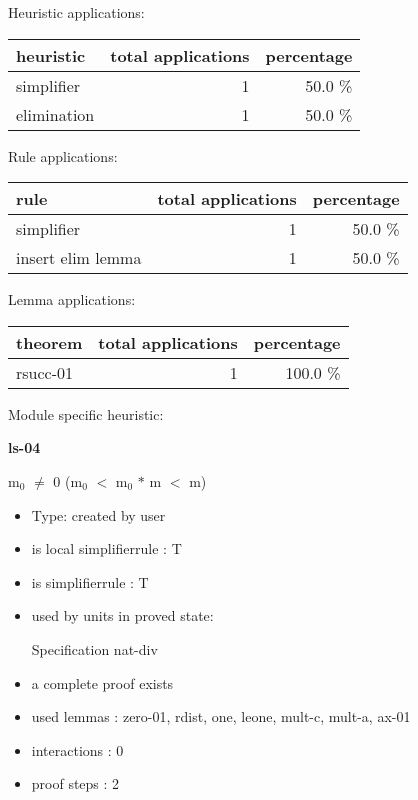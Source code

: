 \documentclass[a4paper]{article}
\begin{document}
\medskip


Heuristic applications:

\begin{supertabular}{l|r|r}
heuristic	& total applications & percentage \\ \hline
simplifier & 1 & 50.0 \% \\
elimination & 1 & 50.0 \% \\

\end{supertabular}

Rule applications:

\begin{supertabular}{l|r|r}
rule	        & total applications & percentage \\ \hline
simplifier & 1 & 50.0 \% \\
insert elim lemma & 1 & 50.0 \% \\

\end{supertabular}

Lemma applications:

\begin{supertabular}{l|r|r}
theorem	        & total applications & percentage \\ \hline
rsucc-01 & 1 & 100.0 \% \\

\end{supertabular}

Module specific heuristic:

\pagebreak

{\LARGE\bf ls-04}\label{lemma-ls-04}

\medskip

 \Fol $\mbox{m}_{0}$ $\neq$ 0 \Imp ($\mbox{m}_{0}$ $<$ $\mbox{m}_{0}$ $*$ m  $<$ m)

\begin{itemize}

\item Type: created by user

\item is local simplifierrule : T
\item is simplifierrule : T
\item used by units in proved state:

Specification nat-div
\item       a complete proof exists
\item       used lemmas  : zero-01, rdist, one, leone, mult-c, mult-a, ax-01
\item       interactions : 0
\item       proof steps  : 2
\end{itemize}
\end{document}
